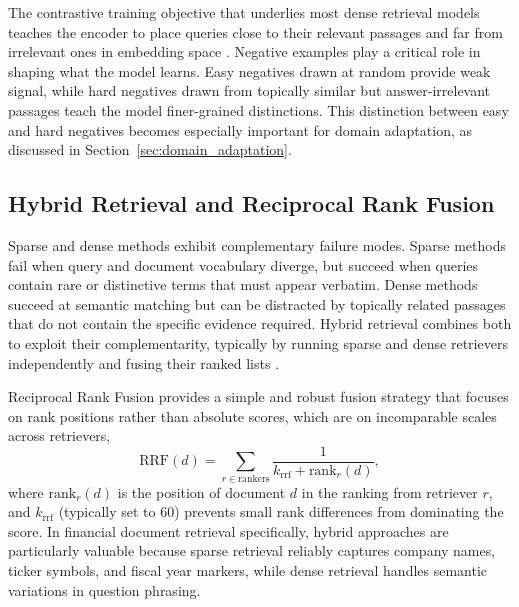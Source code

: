 \documentclass[12pt,twoside,maitrise]{dms}
\newcounter{example}
\theoremstyle{definition}
\numberwithin{equation}{section}
\numberwithin{table}{chapter}
\numberwithin{figure}{chapter}
\begin{document}
The contrastive training objective that underlies most dense retrieval models teaches
the encoder to place queries close to their relevant passages and far from irrelevant
ones in embedding space \citep{izacard2022unsupervised}. Negative examples play a critical role in shaping what the
model learns. Easy negatives drawn at random provide weak signal, while hard negatives
drawn from topically similar but answer-irrelevant passages teach the model
finer-grained distinctions. This distinction between easy and hard negatives becomes
especially important for domain adaptation, as discussed in
Section~\ref{sec:domain_adaptation}.

\subsection{Hybrid Retrieval and Reciprocal Rank Fusion}

Sparse and dense methods exhibit complementary failure modes. Sparse methods fail when
query and document vocabulary diverge, but succeed when queries contain rare or
distinctive terms that must appear verbatim. Dense methods succeed at semantic matching
but can be distracted by topically related passages that do not contain the specific
evidence required. Hybrid retrieval combines both to exploit their complementarity,
typically by running sparse and dense retrievers independently and fusing their ranked
lists \citep{luan2021sparse}.

Reciprocal Rank Fusion \citep{cormack2009reciprocal} provides a simple and robust fusion
strategy that focuses on rank positions rather than absolute scores, which are on
incomparable scales across retrievers,
\begin{equation}
  \text{RRF}(d) = \sum_{r \in \text{rankers}} \frac{1}{k_{\text{rrf}} + \text{rank}_r(d)},
\end{equation}
where $\text{rank}_r(d)$ is the position of document $d$ in the ranking from retriever
$r$, and $k_{\text{rrf}}$ (typically set to 60) prevents small rank differences from
dominating the score. In financial document retrieval specifically, hybrid approaches
are particularly valuable because sparse retrieval reliably captures company names,
ticker symbols, and fiscal year markers, while dense retrieval handles semantic
variations in question phrasing.

\end{document}
